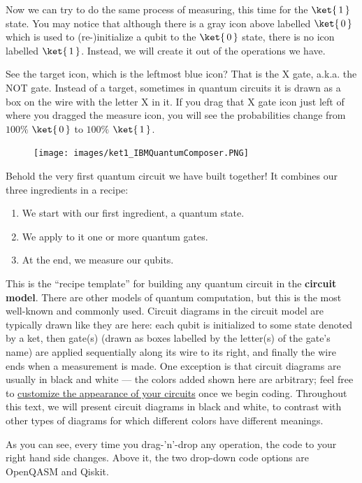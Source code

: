 \documentclass{article}
\theoremstyle{definition}
\newcommand{\kz}[1]{\ket{\,#1\,}}
\begin{document}
Now we can try to do the same process of measuring, this time for the $\kz1$ state.  You may notice that although there is a gray icon above labelled $\kz0$ which is used to (re-)initialize a qubit to the $\kz0$ state, there is no icon labelled $\kz1$.  Instead, we will create it out of the operations we have.

See the target icon, which is the leftmost blue icon?  That is the X gate, a.k.a. the NOT gate.  Instead of a target, sometimes in quantum circuits it is drawn as a box on the wire with the letter X in it.
If you drag that X gate icon just left of where you dragged the measure icon, you will see the probabilities change from $100\%$ $\kz0$ to $100\%$ $\kz1$.
\begin{figure}[H]
	\texttt{[image: images/ket1\_IBMQuantumComposer.PNG]}
	\label{fig:myfirstcircuit}
\end{figure}

Behold the very first quantum circuit we have built together!  It combines our three ingredients in a recipe:
\begin{enumerate}
	\item We start with our first ingredient, a quantum state.
	\item We apply to it one or more quantum gates.
	\item At the end, we measure our qubits.
\end{enumerate}
This is the ``recipe template'' for building any quantum circuit in the \textbf{circuit model}.  There are other models of quantum computation, but this is the most well-known and commonly used.  Circuit diagrams in the circuit model are typically drawn like they are here: each qubit is initialized to some state denoted by a ket, then gate(s) (drawn as boxes labelled by the letter(s) of the gate's name) are applied sequentially along its wire to its right, and finally the wire ends when a measurement is made.  One exception is that circuit diagrams are usually in black and white --- the colors added shown here are arbitrary; feel free to \href{https://medium.com/qiskit/learn-how-to-customize-the-appearance-of-your-qiskit-circuits-with-accessibility-in-mind-b9b59fc039f3}{customize the appearance of your circuits} once we begin coding.  Throughout this text, we will present circuit diagrams in black and white, to contrast with other types of diagrams for which different colors have different meanings.

As you can see, every time you drag-'n'-drop any operation, the code to your right hand side changes.  Above it, the two drop-down code options are OpenQASM and Qiskit.
\end{document}

